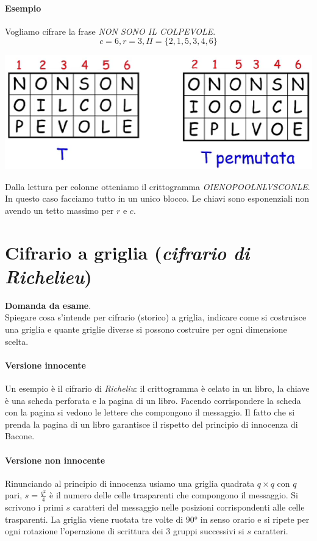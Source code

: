 \paragraph{Esempio} Vogliamo cifrare la frase \emph{NON SONO IL COLPEVOLE}.
$$c = 6, r = 3, \Pi=\{2, 1, 5, 3, 4, 6\}$$
\begin{center}
	\includegraphics[scale=.4]{images/11.PNG}
\end{center}
Dalla lettura per colonne otteniamo il crittogramma \textit{OIENOPOOLNLVSCONLE}. In questo caso facciamo tutto in un unico blocco. Le chiavi sono esponenziali non avendo un tetto massimo per $r$ e $c$.


\section{Cifrario a griglia (\emph{cifrario di Richelieu})}
\begin{framed}
	\noindent \textbf{Domanda da esame}.\\Spiegare cosa s’intende per cifrario (storico) a griglia, indicare come si costruisce una griglia e
	quante griglie diverse si possono costruire per ogni dimensione scelta.
\end{framed} 
\paragraph{Versione innocente}
Un esempio è il cifrario di \emph{Richeliu}: il crittogramma è celato in un libro, la chiave è una scheda perforata e la pagina di un libro. Facendo corrispondere la scheda con la pagina si vedono le lettere che compongono il messaggio. Il fatto che si prenda la pagina di un libro garantisce il rispetto del principio di innocenza di Bacone. 
\paragraph{Versione non innocente} Rinunciando al principio di innocenza usiamo una griglia quadrata $q\times q$ con $q$ pari, $s = \frac{q^2}{4}$ è il numero delle celle trasparenti che compongono il messaggio. Si scrivono i primi $s$ caratteri del messaggio nelle posizioni corrispondenti alle celle trasparenti. La griglia viene ruotata tre volte di $90$° in senso orario e si ripete per ogni rotazione l'operazione di scrittura dei 3 gruppi successivi si $s$ caratteri.

